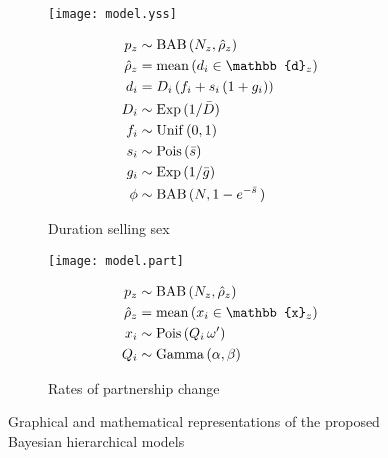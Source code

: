 \begin{figure}
  \begin{subfigure}{\textwidth}
    \begin{minipage}{.5\textwidth}
      \centering\texttt{[image: model.yss]}
    \end{minipage}
    \begin{minipage}{.5\textwidth}
      \begin{align}
           p_z &\sim \distr{BAB}{N_z, \hat{\rho}_z} \\
  \hat{\rho}_z &=    \distr{mean}{d_i \in \mathbb{d}_z} \\
           d_i &=    D_i\,(f_i + s_i\,(1 + g_i)) \\
           D_i &\sim \distr{Exp}{1/\bar{D}} \\
           f_i &\sim \distr{Unif}{0,1} \\
           s_i &\sim \distr{Pois}{\bar{s}} \\
           g_i &\sim \distr{Exp}{1/\bar{g}} \\
          \phi &\sim \distr{BAB}{N, 1-e^{-\bar{s}}\,}
      \end{align}
    \end{minipage}
    \caption{Duration selling sex}
    \label{fig:model.yss}
  \end{subfigure}
  \begin{subfigure}{\textwidth}
    \begin{minipage}{.5\textwidth}
      \centering\texttt{[image: model.part]}
    \end{minipage}
    \begin{minipage}{.5\textwidth}
      \begin{align}
           p_z &\sim \distr{BAB}{N_z, \hat{\rho}_z} \\
  \hat{\rho}_z &=    \distr{mean}{x_i \in \mathbb{x}_z} \\
           x_i &\sim \distr{Pois}{Q_i\,\omega'} \\
           Q_i &\sim \distr{Gamma}{\alpha,\beta}
      \end{align}
    \end{minipage}
    \caption{Rates of partnership change}
    \label{fig:model.part}
  \end{subfigure}
  \caption{Graphical and mathematical representations
    of the proposed Bayesian hierarchical models}
  \label{fig:model}
\end{figure}
